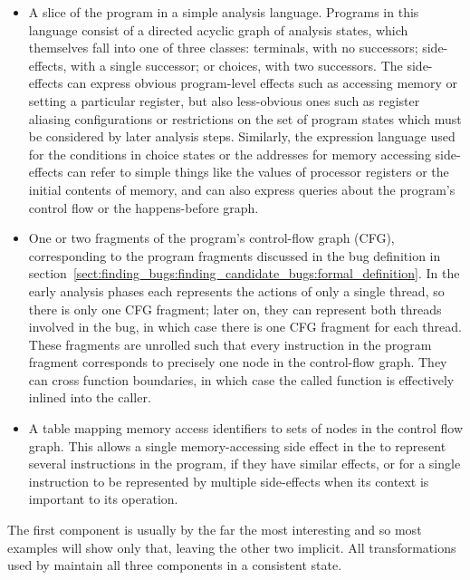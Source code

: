 \begin{itemize}
\item
  A slice of the program in a simple analysis language.  Programs in
  this language consist of a directed acyclic graph of analysis
  states, which themselves fall into one of three classes: terminals,
  with no successors; side-effects, with a single successor; or
  choices, with two successors.  The side-effects can express obvious
  program-level effects such as accessing memory or setting a
  particular register, but also less-obvious ones such as register
  aliasing configurations or restrictions on the set of program states
  which must be considered by later analysis steps.  Similarly, the
  expression language used for the conditions in choice states or the
  addresses for memory accessing side-effects can refer to simple
  things like the values of processor registers or the initial
  contents of memory, and can also express queries about the program's
  control flow or the happens-before graph.
\item
  One or two fragments of the program's control-flow graph (CFG),
  corresponding to the program fragments discussed in the bug
  definition in
  section~\ref{sect:finding_bugs:finding_candidate_bugs:formal_definition}.
  In the early analysis phases each {\StateMachine} represents the
  actions of only a single thread, so there is only one CFG fragment;
  later on, they can represent both threads involved in the bug, in
  which case there is one CFG fragment for each thread.  These
  fragments are unrolled such that every instruction in the program
  fragment corresponds to precisely one node in the control-flow
  graph.  They can cross function boundaries, in which case the called
  function is effectively inlined into the caller.
\item
  A table mapping memory access identifiers to sets of nodes in the
  control flow graph. This allows a single memory-accessing side
  effect in the \StateMachine{} to represent several instructions in
  the program, if they have similar effects, or for a single instruction to be represented by
  multiple side-effects when its context is important to its
  operation.
\end{itemize}

The first component is usually by the far the most interesting and so
most examples will show only that, leaving the other two implicit.
All transformations used by {\technique} maintain all three components
in a consistent state.

